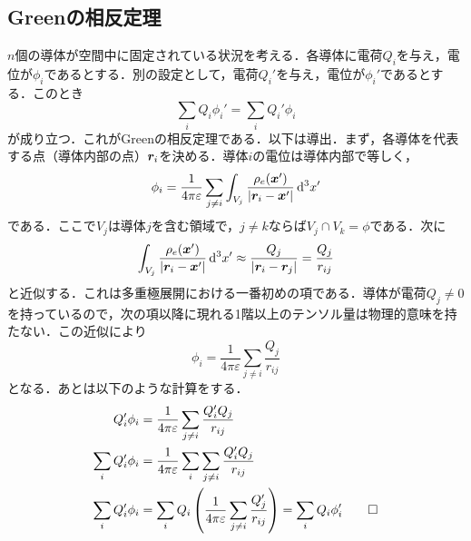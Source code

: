 \documentclass[a4paper,10pt,uplatex]{jsarticle}
\begin{document}
\subsection{Greenの相反定理}
$n$個の導体が空間中に固定されている状況を考える．各導体に電荷$Q_i$を与え，電位が$\phi_i$であるとする．別の設定として，電荷$Q_i'$を与え，電位が$\phi_i'$であるとする．このとき
\begin{equation}
    \sum_{i} Q_i \phi_i' = \sum_{i} Q_i' \phi_i
\end{equation}
が成り立つ．これがGreenの相反定理である．以下は導出．まず，各導体を代表する点（導体内部の点）$\vb*{r}_i$を決める．導体$i$の電位は導体内部で等しく，
\begin{equation}
    \phi_i = \frac{1}{4\pi\varepsilon}\sum_{j\neq i} \int_{V_j} \frac{\rho_e(\vb*{x}')}{|\vb*{r}_i - \vb*{x}'|} \dd[3]{x'}
\end{equation}
である．ここで$V_j$は導体$j$を含む領域で，$j\neq k$ならば$V_j \cap V_k = \phi$である．次に
\begin{equation}
    \int_{V_j} \frac{\rho_e(\vb*{x}')}{|\vb*{r}_i - \vb*{x}'|} \dd[3]{x'} \approx \frac{Q_j}{|\vb*{r}_i - \vb*{r}_j|} = \frac{Q_j}{r_{ij}}
\end{equation}
と近似する．これは多重極展開における一番初めの項である．導体が電荷$Q_j \neq 0$を持っているので，次の項以降に現れる1階以上のテンソル量は物理的意味を持たない．この近似により
\begin{equation}
    \phi_i = \frac{1}{4\pi\varepsilon} \sum_{j\neq i}\frac{Q_j}{r_{ij}}
\end{equation}
となる．あとは以下のような計算をする．
\begin{align}
    Q_i'\phi_i &= \frac{1}{4\pi\varepsilon} \sum_{j\neq i}\frac{Q_i' Q_j}{r_{ij}} \\
    \sum_{i} Q_i' \phi_i &= \frac{1}{4\pi\varepsilon} \sum_{i}\sum_{j\neq i}\frac{Q_i' Q_j}{r_{ij}} \\
    \sum_{i} Q_i' \phi_i &= \sum_{i} Q_i \left(\frac{1}{4\pi\varepsilon} \sum_{j \neq i} \frac{Q_j'}{r_{ij}} \right) = \sum_{i} Q_i \phi_i' \qed
\end{align}
\end{document}
